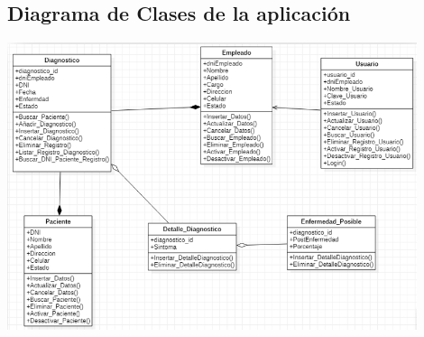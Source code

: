 \documentclass[preprint,12pt]{elsarticle}
\begin{document}
\subsection{\textbf{ Diagrama de Clases de la aplicación }}
\begin{center}
	\includegraphics[width=12cm]{./imagen/diagrmclasesvistaprocesos} 
	
	\end{center}
\end{document}
